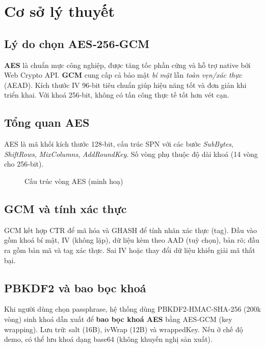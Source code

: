 \chapter{Cơ sở lý thuyết}

\section{Lý do chọn AES‑256‑GCM}
\textbf{AES} là chuẩn mực công nghiệp, được tăng tốc phần cứng và hỗ trợ native bởi Web Crypto API. \textbf{GCM} cung cấp cả bảo mật \textit{bí mật} lẫn \textit{toàn vẹn/xác thực} (AEAD). Kích thước IV 96‑bit tiêu chuẩn giúp hiệu năng tốt và đơn giản khi triển khai. Với khoá 256‑bit, không có tấn công thực tế tốt hơn vét cạn.

\section{Tổng quan AES}
AES là mã khối kích thước 128‑bit, cấu trúc SPN với các bước \textit{SubBytes}, \textit{ShiftRows}, \textit{MixColumns}, \textit{AddRoundKey}. Số vòng phụ thuộc độ dài khoá (14 vòng cho 256‑bit).

\begin{figure}[H]
  \centering
  \caption{Cấu trúc vòng AES (minh hoạ)}
\end{figure}

\section{GCM và tính xác thực}
GCM kết hợp CTR để mã hóa và GHASH để tính nhãn xác thực (tag). Đầu vào gồm khoá bí mật, IV (không lặp), dữ liệu kèm theo AAD (tuỳ chọn), bản rõ; đầu ra gồm bản mã và tag xác thực. Sai IV hoặc thay đổi dữ liệu khiến giải mã thất bại.

\section{PBKDF2 và bao bọc khoá}
Khi người dùng chọn passphrase, hệ thống dùng PBKDF2‑HMAC‑SHA‑256 (200k vòng) sinh khoá dẫn xuất để \textbf{bao bọc khoá AES} bằng AES‑GCM (key wrapping). Lưu trữ: salt (16B), ivWrap (12B) và wrappedKey. Nếu ở chế độ demo, có thể lưu khoá dạng base64 (không khuyến nghị sản xuất).

